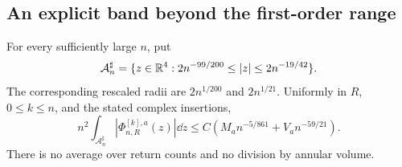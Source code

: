 \subsection{An explicit band beyond the first-order range}
\begin{theorem}
\label{thm:wider-fixed-count-annulus}
For every sufficiently large $n$, put
\begin{equation}\label{eq:wider-fixed-count-annulus}
 \mathcal A_n^{\sharp}
 =\{z\in\R^4:2n^{-99/200}\le |z|\le2n^{-19/42}\}.
\end{equation}
The corresponding rescaled radii are $2n^{1/200}$ and $2n^{1/21}$.
Uniformly in $R$, $0\le k\le n$, and the stated complex insertions,
\begin{equation}\label{eq:wider-fixed-count-bound}
 n^2\int_{\mathcal A_n^{\sharp}}
           |\Phi^{[k],a}_{n,R}(z)|\dd z
       \le C\left(M_an^{-5/861}+V_an^{-59/21}\right).
\end{equation}
There is no average over return counts and no division by annular volume.
\end{theorem}

